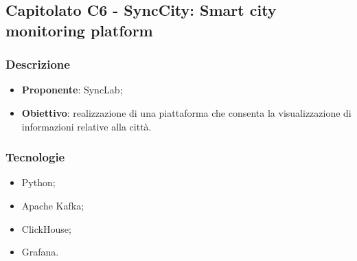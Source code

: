 \subsection{Capitolato C6 - SyncCity: Smart city monitoring platform}


\subsubsection{Descrizione}
\begin{itemize}
    \item \textbf{Proponente}: SyncLab;
    \item \textbf{Obiettivo}: realizzazione di una piattaforma che consenta la visualizzazione di informazioni relative alla città.
\end{itemize}


\subsubsection{Tecnologie}
\begin{itemize}
    \item Python;
    \item Apache Kafka;
    \item ClickHouse;
    \item Grafana.
\end{itemize}



